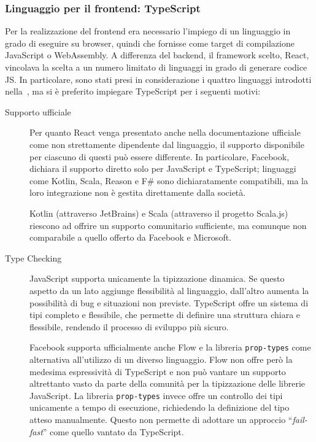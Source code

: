     \subsubsection{Linguaggio per il frontend: TypeScript}\label{subsub:ts}
      Per la realizzazione del frontend era necessario l'impiego di un linguaggio in grado di eseguire su browser, quindi che fornisse come target di compilazione JavaScript o WebAssembly.
      A differenza del backend, il framework scelto, React, vincolava la scelta a un numero limitato di linguaggi in grado di generare codice JS\@.
      In particolare, sono stati presi in considerazione i quattro linguaggi introdotti nella~, ma si è preferito impiegare TypeScript per i seguenti motivi:

      \begin{description}
        \item[Supporto ufficiale]
          Per quanto React venga presentato anche nella documentazione ufficiale come non strettamente dipendente dal linguaggio, il supporto disponibile per ciascuno di questi può essere differente.
          In particolare, Facebook, dichiara il supporto diretto solo per JavaScript e TypeScript;
          linguaggi come Kotlin, Scala, Reason e F\# sono dichiaratamente compatibili, ma la loro integrazione non è gestita direttamente dalla società.

          Kotlin (attraverso JetBrains) e Scala (attraverso il progetto Scala.js) riescono ad offrire un supporto comunitario sufficiente, ma comunque non comparabile a quello offerto da Facebook e Microsoft.

        \item[Type Checking]
          JavaScript supporta unicamente la tipizzazione dinamica.
          Se questo aspetto da un lato aggiunge flessibilità al linguaggio, dall'altro aumenta la possibilità di bug e situazioni non previste.
          TypeScript offre un sistema di tipi completo e flessibile, che permette di definire una struttura chiara e flessibile, rendendo il processo di sviluppo più sicuro.

          Facebook supporta ufficialmente anche Flow e la libreria \texttt{prop-types} come alternativa all'utilizzo di un diverso linguaggio.
          Flow non offre però la medesima espressività di TypeScript e non può vantare un supporto altrettanto vasto da parte della comunità per la tipizzazione delle librerie JavaScript.
          La libreria \texttt{prop-types} invece offre un controllo dei tipi unicamente a tempo di esecuzione, richiedendo la definizione del tipo atteso manualmente.
          Questo non permette di adottare un approccio ``\emph{fail-fast}'' come quello vantato da TypeScript.


\end{description}
